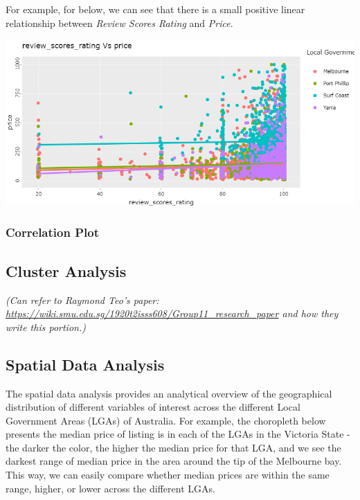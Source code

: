 \documentclass{acm_proc_article-sp}
\begin{document}
For example, for below, we can see that there is a small positive linear
relationship between \emph{Review Scores Rating} and \emph{Price}.

\includegraphics{images/bivariate.png}

\hypertarget{correlation-plot}{%
\subsubsection{Correlation Plot}\label{correlation-plot}}

\hypertarget{cluster-analysis}{%
\subsection{Cluster Analysis}\label{cluster-analysis}}

\emph{(Can refer to Raymond Teo's paper:
\url{https://wiki.smu.edu.sg/1920t2isss608/Group11_research_paper} and
how they write this portion.)}

\hypertarget{spatial-data-analysis}{%
\subsection{Spatial Data Analysis}\label{spatial-data-analysis}}

The spatial data analysis provides an analytical overview of the
geographical distribution of different variables of interest across the
different Local Government Areas (LGAs) of Australia. For example, the
choropleth below presents the median price of listing is in each of the
LGAs in the Victoria State - the darker the color, the higher the median
price for that LGA, and we see the darkest range of median price in the
area around the tip of the Melbourne bay. This way, we can easily
compare whether median prices are within the same range, higher, or
lower across the different LGAs.
\end{document}
